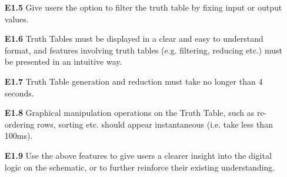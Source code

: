 \begin{itemize}
    \medskip
    \item[\textbf{E1.5}] Give users the option to filter the truth table by fixing input or output values.
    \medskip
    \item[\textbf{\textbf{E1.6}}] Truth Tables must be displayed in a clear and easy to understand format, and features involving truth tables (e.g. filtering, reducing etc.) must be presented in an intuitive way.
    \item[\textbf{\textbf{E1.7}}] Truth Table generation and reduction must take no longer than 4 seconds.
    \item[\textbf{\textbf{E1.8}}] Graphical manipulation operations on the Truth Table, such as re-ordering rows, sorting etc. should appear instantaneous (i.e. take less than 100ms).
    \item[\textbf{E1.9}] Use the above features to give users a clearer insight into the digital logic on the schematic, or to further reinforce their existing understanding.
\end{itemize}

